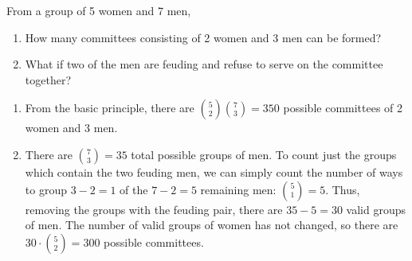 \begin{changebar}
    \begin{example}
        From a group of 5 women and 7 men, \begin{enumerate}[label=(\alph*)]
            \item How many committees consisting of 2 women and 3 men can be formed?
            \item What if two of the men are feuding and refuse to serve on the committee together?
        \end{enumerate}
    \end{example}
    \begin{solution}\hfill
        \begin{enumerate}[label=(\alph*)]
            \item From the basic principle, there are $\displaystyle \binom{5}{2}\binom{7}{3} = 350$ possible committees of 2 women and 3 men.
            \item There are $\displaystyle \binom{7}{3} = 35$ total possible groups of men. To count just the groups which contain the two feuding men, we can simply count the number of ways to group $3-2 = 1$ of the $7-2 = 5$ remaining men: $\displaystyle \binom{5}{1} = 5$. Thus, removing the groups with the feuding pair, there are $35 - 5 = 30$ valid groups of men. The number of valid groups of women has not changed, so there are $\displaystyle 30\cdot\binom{5}{2} = 300$ possible committees.
        \end{enumerate}
    \end{solution}
\end{changebar}

